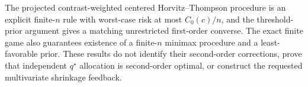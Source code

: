 The projected contrast-weighted centered Horvitz--Thompson procedure is an explicit finite-\(n\) rule with worst-case risk at most \(C_0(c)/n\), and the threshold-prior argument gives a matching unrestricted first-order converse.  The exact finite game also guarantees existence of a finite-\(n\) minimax procedure and a least-favorable prior.  These results do not identify their second-order corrections, prove that independent \(q^\star\) allocation is second-order optimal, or construct the requested multivariate shrinkage feedback.